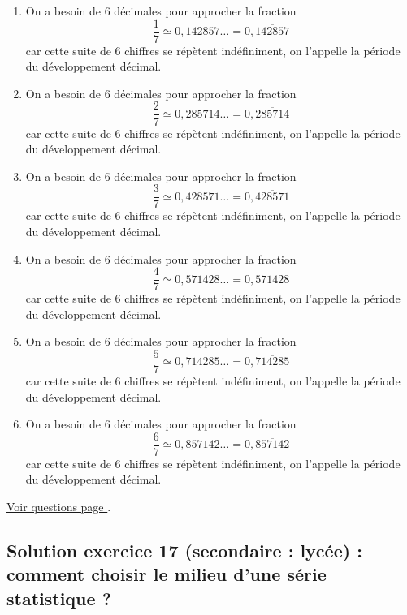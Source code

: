 \begin{enumerate}[label=C\arabic*)]
	\item On a besoin de 6 décimales pour approcher la fraction 
	\[\dfrac{1}{7} \simeq 0,142857\dots = 0,\overline{142857}\]
	car cette suite de 6 chiffres se répètent indéfiniment, on l'appelle la période du développement décimal.
	\item On a besoin de 6 décimales pour approcher la fraction 
	\[\dfrac{2}{7} \simeq 0,285714\dots = 0,\overline{285714}\]
	car cette suite de 6 chiffres se répètent indéfiniment, on l'appelle la période du développement décimal.
	\item On a besoin de 6 décimales pour approcher la fraction 
	\[\dfrac{3}{7} \simeq 0,428571\dots = 0,\overline{428571}\]
	car cette suite de 6 chiffres se répètent indéfiniment, on l'appelle la période du développement décimal.
	\item On a besoin de 6 décimales pour approcher la fraction 
	\[\dfrac{4}{7} \simeq 0,571428\dots = 0,\overline{571428}\]
	car cette suite de 6 chiffres se répètent indéfiniment, on l'appelle la période du développement décimal.
	\item On a besoin de 6 décimales pour approcher la fraction 
	\[\dfrac{5}{7} \simeq 0,714285\dots = 0,\overline{714285}\]
	car cette suite de 6 chiffres se répètent indéfiniment, on l'appelle la période du développement décimal.
	\item On a besoin de 6 décimales pour approcher la fraction 
	\[\dfrac{6}{7} \simeq 0,857142\dots = 0,\overline{857142}\]
	car cette suite de 6 chiffres se répètent indéfiniment, on l'appelle la période du développement décimal.
\end{enumerate}

\hyperref[calc:niveau16]{Voir questions page \pageref{calc:niveau16}}.


\newpage

\subsection{Solution exercice 17 (secondaire : lycée) : comment choisir le milieu d'une série statistique ?}

\label{sol:niveau17}

